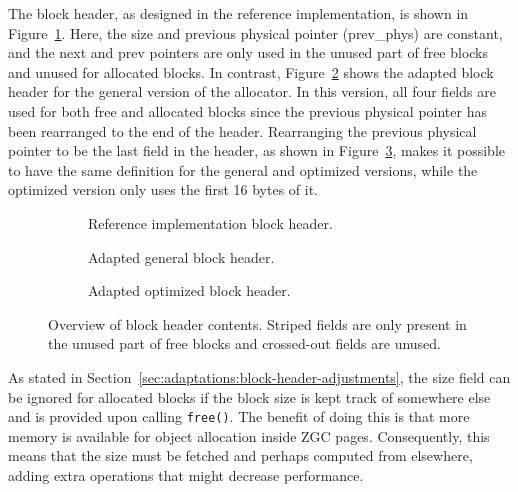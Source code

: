 The block header, as designed in the reference implementation, is shown in Figure~\ref{fig:blockheader_adap_reference}. Here, the size and previous physical pointer (prev\_phys) are constant, and the next and prev pointers are only used in the unused part of free blocks and unused for allocated blocks. In contrast, Figure~\ref{fig:blockheader_adap_general} shows the adapted block header for the general version of the allocator. In this version, all four fields are used for both free and allocated blocks since the previous physical pointer has been rearranged to the end of the header. Rearranging the previous physical pointer to be the last field in the header, as shown in Figure~\ref{fig:blockheader_adap_optimized}, makes it possible to have the same definition for the general and optimized versions, while the optimized version only uses the first 16 bytes of it.

\begin{figure}[h]
    \centering
    \begin{subfigure}[b]{0.3\textwidth}
        \centering
        
        \caption{Reference implementation block header.}
        \label{fig:blockheader_adap_reference}
    \end{subfigure}%
    \hfill
    \begin{subfigure}[b]{0.3\textwidth}
        \centering
        
        \caption{Adapted general block header.}
        \label{fig:blockheader_adap_general}
    \end{subfigure}%
    \hfill
    \begin{subfigure}[b]{0.3\textwidth}
        \centering
        
        \caption{Adapted optimized block header.}
        \label{fig:blockheader_adap_optimized}
    \end{subfigure}
    \caption{Overview of block header contents. Striped fields are only present in the unused part of free blocks and crossed-out fields are unused.}
    \label{fig:blockheader_adaptations}
\end{figure}

As stated in Section~\ref{sec:adaptations:block-header-adjustments}, the size field can be ignored for allocated blocks if the block size is kept track of somewhere else and is provided upon calling \texttt{free()}. The benefit of doing this is that more memory is available for object allocation inside ZGC pages. Consequently, this means that the size must be fetched and perhaps computed from elsewhere, adding extra operations that might decrease performance. 

